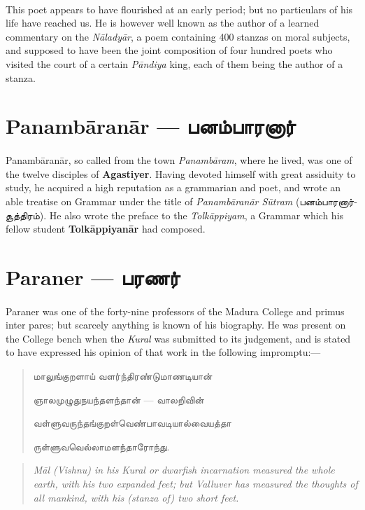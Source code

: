 \documentclass{article}
\newcommand{\TamilText}[1]{\texttamil{#1}}
\newcommand{\TamilBold}[1]{\texttamil{\textbf{#1}}}
\newcommand{\tam}[1]{\TamilText{#1}}
\newcommand{\tambold}[1]{\TamilBold{#1}}
\begin{document}
\paragraph{}
This poet appears to have flourished at an early period; but no particulars of his life have reached us. He is however well known as the author of a learned commentary on the \emph{N\={a}lady\={a}r}, a poem containing 400 stanzas on moral subjects, and supposed to have been the joint composition of four hundred poets who visited the court of a certain \emph{P\={a}ndiya} king, each of them being the author of a stanza.

\section{Panamb\={a}ran\={a}r --- \tambold{பனம்பாரனார்}}
\paragraph{}
Panamb\={a}ran\={a}r, so called from the town \emph{Panamb\={a}ram}, where he lived, was one of the twelve disciples of \textbf{Agastiyer}. Having devoted himself with great assiduity to study, he acquired a high reputation as a grammarian and poet, and wrote an able treatise on Grammar under the title of \emph{Panamb\={a}ran\={a}r S\={u}tram} (\tam{பனம்பாரனார்சூத்திரம்}). He also wrote the preface to the \emph{Tolk\={a}ppiyam}, a Grammar which his fellow student \textbf{Tolk\={a}ppiyan\={a}r} had composed.

\section{Paraner --- \tambold{பரணர்}}
\paragraph{}
Paraner was one of the forty-nine professors of the Madura College and primus inter pares; but scarcely anything is known of his biography. He was present on the College bench when the \emph{Kural} was submitted to its judgement, and is stated to have expressed his opinion of that work in the following impromptu:---
\begin{quotation}\small
\tam{மாலுங்குறளாய்‌ வளர்ந்திரண்டுமாணடியான்‌}

\tam{ஞாலமுழுதுநயந்தளந்தான்‌} --- \tam{வாலறிவின்‌}

\tam{வள்ளுவருந்தங்குறள்‌வெண்பாவடியால்வையத்தா}

\tam{ருள்ளுவவெல்லாமளந்தாரோந்து}.
\end{quotation}
\begin{quotation}\small
\emph{M\={a}l (Vishnu) in his Kural or dwarfish incarnation measured the whole earth, with his two expanded feet; but Valluver has measured the thoughts of all mankind, with his (stanza of) two short feet.}
\end{quotation}
\end{document}
